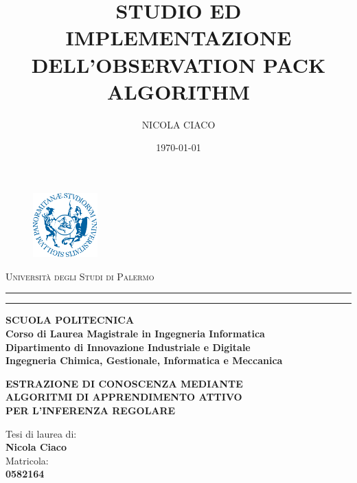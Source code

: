 \documentclass[12pt, oneside]{book}
\theoremstyle{definition}
\theoremstyle{plain}
\begin{document}
\pagestyle{empty}
\title{STUDIO ED IMPLEMENTAZIONE DELL'OBSERVATION PACK ALGORITHM}
\author{NICOLA CIACO}
\date{\today}

\begin{titlepage}
\begin{center}
\begin{figure}[!h]
  	\centering
 	\includegraphics[width=2.5cm]{./pictures/frontespizio/logo_unipa.png}
\end{figure}
{{\Large{\textsc{Università degli Studi di Palermo}}}} \\
\rule[0.1cm]{15.8cm}{0.1mm}
\rule[0.5cm]{15.8cm}{0.6mm}
{\small{\bf SCUOLA POLITECNICA\\
Corso di Laurea Magistrale in Ingegneria Informatica\\
Dipartimento di Innovazione Industriale e Digitale \\Ingegneria Chimica, Gestionale, Informatica e Meccanica}}\\
\vspace{10mm}
\end{center}
\vspace{10mm}
\begin{center}
{\Large{\bf ESTRAZIONE DI CONOSCENZA MEDIANTE}}\\
\vspace{3mm}
{\Large{\bf  ALGORITMI DI APPRENDIMENTO ATTIVO }}\\
 \vspace{3mm}
 {\Large{\bf PER L'INFERENZA REGOLARE}}\\
\end{center}
\vspace{18mm}
\par
\noindent
\begin{minipage}[t]{0.70\textwidth}\raggedright
{\large Tesi di laurea di:\\
\vspace{3mm}
\textbf {Nicola Ciaco}\\
\vspace{10mm}
Matricola:\\
\vspace{3mm}
\textbf {0582164}\\

}
\end{minipage}
\end{titlepage}
\end{document}
